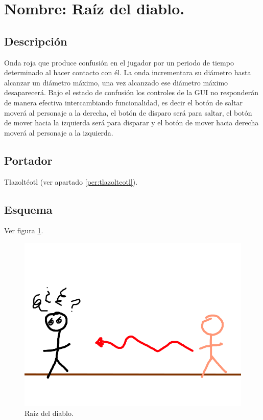 \section{Nombre: Raíz del diablo.}\label{hab.RaizDia}
\subsection{Descripción}
Onda roja que produce confusión en el jugador por un periodo de tiempo determinado al hacer contacto con él. La onda incrementara su diámetro hasta alcanzar un diámetro máximo, una vez alcanzado ese diámetro máximo desaparecerá. Bajo el estado de confusión los controles de la GUI no responderán de manera efectiva intercambiando funcionalidad, es decir el botón de saltar moverá al personaje a la derecha, el botón de disparo será para saltar, el botón de mover hacia la izquierda será para disparar y el botón de mover hacia derecha moverá al personaje a la izquierda. 
\subsection{Portador}
Tlazoltéotl (ver apartado \ref{per:tlazolteotl}).
\subsection{Esquema}
			Ver figura \ref{fig:raiz}.
			\begin{figure}
				\centering
				\includegraphics[height=0.2 \textheight]{Imagenes/raiz}
				\caption{Raíz del diablo.}
				\label{fig:raiz}
			\end{figure}

